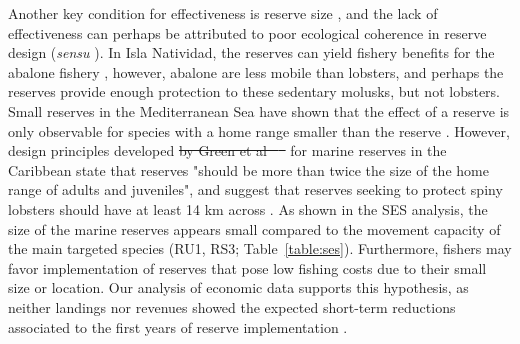 \documentclass[10pt,letterpaper]{article}
\providecommand{\DIFaddtex}[1]{{\protect\color{blue}\uwave{#1}}} %
\providecommand{\DIFdeltex}[1]{{\protect\color{red}\sout{#1}}}                      %
\providecommand{\DIFaddbegin}{} %
\providecommand{\DIFaddend}{} %
\providecommand{\DIFdelbegin}{} %
\providecommand{\DIFdelend}{} %
\providecommand{\DIFadd}[1]{\texorpdfstring{\DIFaddtex{#1}}{#1}} %
\providecommand{\DIFdel}[1]{\texorpdfstring{\DIFdeltex{#1}}{}} %
\newcommand{\DIFscaledelfig}{0.5}
\newlength{\DIFdelgraphicswidth} %
\newlength{\DIFdelgraphicsheight} %
\newcommand{\DIFaddincludegraphics}[2][]{{\color{blue}\fbox{\DIFOincludegraphics[#1]{#2}}}} %
\newcommand{\DIFdelincludegraphics}[2][]{%
\sbox{\DIFdelgraphicsbox}{\DIFOincludegraphics[#1]{#2}}%
\settoboxwidth{\DIFdelgraphicswidth}{\DIFdelgraphicsbox} %
\settoboxtotalheight{\DIFdelgraphicsheight}{\DIFdelgraphicsbox} %
\scalebox{\DIFscaledelfig}{%
\parbox[b]{\DIFdelgraphicswidth}{\usebox{\DIFdelgraphicsbox}\\[-\baselineskip] \rule{\DIFdelgraphicswidth}{0em}}\llap{\resizebox{\DIFdelgraphicswidth}{\DIFdelgraphicsheight}{%
\setlength{\unitlength}{\DIFdelgraphicswidth}%
\begin{picture}(1,1)%
\thicklines\linethickness{2pt} %
{\color[rgb]{1,0,0}\put(0,0){\framebox(1,1){}}}%
{\color[rgb]{1,0,0}\put(0,0){\line( 1,1){1}}}%
{\color[rgb]{1,0,0}\put(0,1){\line(1,-1){1}}}%
\end{picture}%
}\hspace*{3pt}}} %
} %
\DeclareRobustCommand{\DIFaddbegin}{\DIFOaddbegin \let\includegraphics\DIFaddincludegraphics} %
\DeclareRobustCommand{\DIFaddend}{\DIFOaddend \let\includegraphics\DIFOincludegraphics} %
\DeclareRobustCommand{\DIFdelbegin}{\DIFOdelbegin \let\includegraphics\DIFdelincludegraphics} %
\DeclareRobustCommand{\DIFdelend}{\DIFOaddend \let\includegraphics\DIFOincludegraphics} %
\begin{document}
Another key condition for effectiveness is reserve size \cite{edgar_2014-UO}, and the lack of effectiveness can perhaps be attributed to poor ecological coherence in reserve design (\emph{sensu} \cite{rees_2018}). In Isla Natividad, the reserves can yield fishery benefits for the abalone fishery \cite{rossetto_2015-V0}, however, abalone are less mobile than lobsters, and perhaps the reserves provide enough protection to these sedentary molusks, but not lobsters. Small reserves in the Mediterranean Sea have shown that the effect of a reserve is only observable for species with a home range smaller than the reserve \cite{difranco_2018}. However, design principles developed \DIFdelbegin \DIFdel{by Green et al \mbox{%
\cite{green_2017} }\hspace{0pt}%
}\DIFdelend for marine reserves in the Caribbean state that reserves "should be more than twice the size of the home range of adults and juveniles", and suggest that reserves seeking to protect spiny lobsters should have at least 14 km across \DIFaddbegin \DIFadd{\mbox{%
\cite{green_2017}}\hspace{0pt}%
}\DIFaddend . As shown in the SES analysis, the size of the marine reserves appears small compared to the movement capacity of the main targeted species (RU1, RS3; Table~\ref{table:ses}). Furthermore, fishers may favor implementation of reserves that pose low fishing costs due to their small size or location. Our analysis of economic data supports this hypothesis, as neither landings nor revenues showed the expected short-term reductions associated to the first years of reserve implementation \cite{ovando_2016-Wg}.
\end{document}
